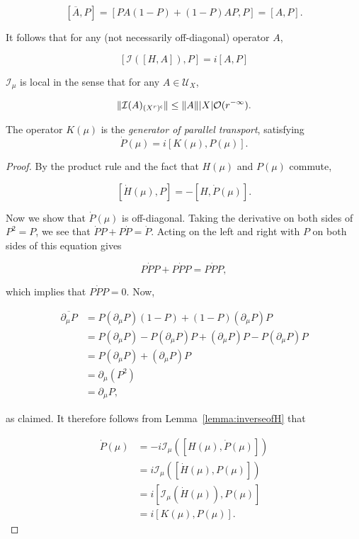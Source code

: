\documentclass[12pt, letterpaper]{article}
\begin{document}
\[[\overline{A}, P] = [PA(1-P) + (1-P)AP, P] = [A,P].\]

It follows that for any (not necessarily off-diagonal) operator $A$, 

\[[\mathcal{I}([H, A]),P] = i[A,P]\]

\begin{lemma}
$\mathcal{I}_\mu$ is local in the sense that for any $A \in \mathcal{U}_X$, 

\[\lVert \mathcal{I}(A)_{(X^r)^\mathsf{c}} \rVert \leq \lVert A \rVert |X| \mathcal{O}(r^{-\infty}).\]
\label{lemma:local}
\end{lemma}

\begin{proposition}
The operator $K(\mu)$ is the \emph{generator of parallel transport}, satisfying
\[\dot{P}(\mu) = i[K(\mu),P(\mu)].\]
\label{prop:generatorparalleltransport}
\end{proposition}
\begin{proof}
By the product rule and the fact that $H(\mu)$ and $P(\mu)$ commute, 

\[ [\dot{H}(\mu), P] = -[H, \dot{P}(\mu)]. \]

Now we show that $\dot{P}(\mu)$ is off-diagonal. Taking the derivative on both sides of $P^2=P$, we see that $\dot{P}P + P\dot{P} = \dot{P}$. Acting on the left and right with $P$ on both sides of this equation gives 

\[P\dot{P}P + P\dot{P}P = P\dot{P}P,\]

which implies that $P\dot{P}P = 0$. Now, 

\[\begin{aligned}
\overline{\partial_\mu P} &= P(\partial_\mu P)(1-P) + (1-P)(\partial_\mu P)P\\
&= P(\partial_\mu P) - P(\partial_\mu P)P + (\partial_\mu P)P - P(\partial_\mu P)P\\
&= P(\partial_\mu P) + (\partial_\mu P)P\\
&= \partial_\mu (P^2)\\
&= \partial_\mu P,
\end{aligned}\]

as claimed. It therefore follows from Lemma~\ref{lemma:inverseofH} that

\[\begin{aligned}
\dot{P}(\mu) &= -i \mathcal{I}_\mu([H(\mu), \dot{P}(\mu)])\\
&= i\mathcal{I}_\mu([\dot{H}(\mu), P(\mu)])\\
&= i[\mathcal{I}_\mu(\dot{H}(\mu)), P(\mu)]\\
&= i[K(\mu), P(\mu)].
\end{aligned}\]
\end{proof}
\end{document}
